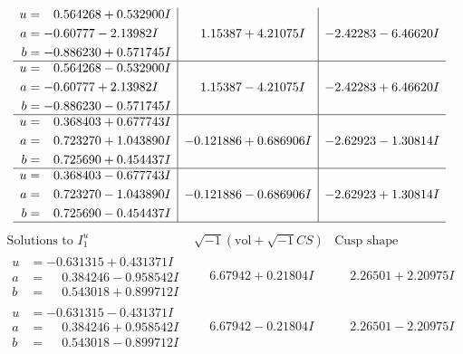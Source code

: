\documentclass[1p]{elsarticle_modified}
\theoremstyle{definition}
\newcommand{\I}{\sqrt{-1}}
\begin{document}
$$\begin{array}{c|c|c}
\begin{aligned}
u &= \phantom{-}0.564268 + 0.532900 I \\
a &= -0.60777 - 2.13982 I \\
b &= -0.886230 + 0.571745 I\end{aligned}
 & \phantom{-}1.15387 + 4.21075 I & -2.42283 - 6.46620 I \\ \hline\begin{aligned}
u &= \phantom{-}0.564268 - 0.532900 I \\
a &= -0.60777 + 2.13982 I \\
b &= -0.886230 - 0.571745 I\end{aligned}
 & \phantom{-}1.15387 - 4.21075 I & -2.42283 + 6.46620 I \\ \hline\begin{aligned}
u &= \phantom{-}0.368403 + 0.677743 I \\
a &= \phantom{-}0.723270 + 1.043890 I \\
b &= \phantom{-}0.725690 + 0.454437 I\end{aligned}
 & -0.121886 + 0.686906 I & -2.62923 - 1.30814 I \\ \hline\begin{aligned}
u &= \phantom{-}0.368403 - 0.677743 I \\
a &= \phantom{-}0.723270 - 1.043890 I \\
b &= \phantom{-}0.725690 - 0.454437 I\end{aligned}
 & -0.121886 - 0.686906 I & -2.62923 + 1.30814 I\\
 \hline 
 \end{array}$$\newpage$$\begin{array}{c|c|c}  
\text{Solutions to }I^u_{1}& \I (\text{vol} + \sqrt{-1}CS) & \text{Cusp shape}\\
 \hline 
\begin{aligned}
u &= -0.631315 + 0.431371 I \\
a &= \phantom{-}0.384246 - 0.958542 I \\
b &= \phantom{-}0.543018 + 0.899712 I\end{aligned}
 & \phantom{-}6.67942 + 0.21804 I & \phantom{-}2.26501 + 2.20975 I \\ \hline\begin{aligned}
u &= -0.631315 - 0.431371 I \\
a &= \phantom{-}0.384246 + 0.958542 I \\
b &= \phantom{-}0.543018 - 0.899712 I\end{aligned}
 & \phantom{-}6.67942 - 0.21804 I & \phantom{-}2.26501 - 2.20975 I \\ \hline\begin{aligned}

\end{aligned}
\end{array}$$
\end{document}

